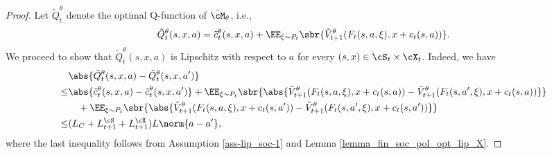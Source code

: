 \documentclass[9pt]{article}
\numberwithin{equation}{section}
\begin{document}
 \begin{proof}
 Let $\tilde{Q}^\theta_t$ denote the optimal Q-function of $\tilde{\cM}_\theta$, i.e.,
 \begin{align*}
     \tilde{Q}^\theta_t(s,x,a) = \tilde{c}^\theta_t(s,x,a) + \EE_{\xi \sim P_t} \sbr{\tilde{V}_{t+1}^\theta (F_t(s,a, \xi), x + c_t(s,a)) }.
 \end{align*}
 We proceed to show that $\tilde{Q}^\theta_t(s,x,a)$ is Lipschitz with respect to $a$ for every $(s,x) \in \cS_t \times \cX_t$. 
 Indeed, we have 
 \begin{align}
     & \abs{\tilde{Q}^\theta_t(s,x,a) - \tilde{Q}^\theta_t(s,x,a')} \nonumber \\
      \leq &  \abs{
     \tilde{c}^\theta_t(s,x,a) - \tilde{c}^\theta_t(s,x,a')
     } + \EE_{\xi \sim P_t}
     \sbr{
     \abs{\tilde{V}_{t+1}^\theta (F_t(s,a, \xi), x + c_t(s,a))  - 
     \tilde{V}_{t+1}^\theta (F_t(s,a', \xi), x + c_t(s,a)) } } \nonumber \\
     & ~~~ +   \EE_{\xi \sim P_t} \sbr{ \abs{
     \tilde{V}_{t+1}^\theta (F_t(s,a, \xi), x + c_t(s,a'))  - 
     \tilde{V}_{t+1}^\theta (F_t(s,a', \xi), x + c_t(s,a'))
     }
     }  \nonumber \\
      \leq  & 
     ( L_C   
     + L_{t+1}^{\cS}  
     + L_{t+1}^{\cX} ) L   \norm{a-a'}, \label{lip_q_in_a_soc}
 \end{align}
 where the last inequality follows from Assumption \ref{ass-lip_soc-1} and Lemma \ref{lemma_fin_soc_pol_opt_lip_X}.



\end{proof}
\end{document}
